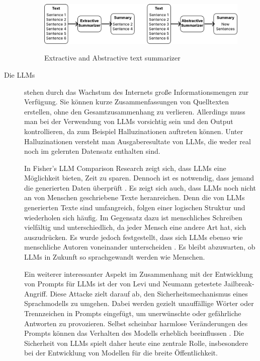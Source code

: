 \begin{description}
    \begin{figure}[H]
    \centering
    \includegraphics[width=0.8\linewidth]{Images/Extractive text summarizer and Abstractive text summarizer.pdf}\\
    \caption{Extractive and Abstractive text summarizer \cite[S.3]{yadav2022automatictextsummarizationmethods}}
    \label{fig:Extractive text summarizer and Abstractive text summarizer}
    \end{figure}

    
    \item[Die \ac{LLM}s] stehen durch das Wachstum des Internets große Informationsmengen zur Verfügung. Sie können kurze Zusammenfassungen von Quelltexten erstellen, ohne den Gesamtzusammenhang zu verlieren. Allerdings muss man bei der Verwendung von \ac{LLM}s vorsichtig sein und den Output kontrollieren, da zum Beispiel Halluzinationen auftreten können. Unter Halluzinationen versteht man Ausgaberesultate von \ac{LLM}s, die weder real noch im gelernten Datensatz enthalten sind. \cite[S.1]{banerjee2023benchmarkingllmpoweredchatbots}

    In Fisher's \ac{LLM} Comparison Research zeigt sich, dass \ac{LLM}s eine Möglichkeit bieten, Zeit zu sparen. Dennoch ist es notwendig, dass jemand die generierten Daten überprüft \cite{fisher2024large}. Es zeigt sich auch, dass \ac{LLM}s noch nicht an von Menschen geschriebene Texte heranreichen. Denn die von \ac{LLM}s generierten Texte sind umfangreich, folgen einer logischen Struktur und wiederholen sich häufig. Im Gegensatz dazu ist menschliches Schreiben vielfältig und unterschiedlich, da jeder Mensch eine andere Art hat, sich auszudrücken. Es wurde jedoch festgestellt, dass sich \ac{LLM}s ebenso wie menschliche Autoren voneinander unterscheiden \cite{rosenfeld2024whose}. Es bleibt abzuwarten, ob \ac{LLM}s in Zukunft so sprachgewandt werden wie Menschen.

     Ein weiterer interessanter Aspekt im Zusammenhang mit der Entwicklung von Prompts für \ac{LLM}s ist der von Levi und Neumann getestete Jailbreak-Angriff. Diese Attacke zielt darauf ab, den Sicherheitsmechanismus eines Sprachmodells zu umgehen. Dabei werden gezielt unauffällige Wörter oder Trennzeichen in Prompts eingefügt, um unerwünschte oder gefährliche Antworten zu provozieren. Selbst scheinbar harmlose Veränderungen des Prompts können das Verhalten des Modells erheblich beeinflussen \cite{levi2024vocabularyattackhijacklarge}. Die Sicherheit von \ac{LLM}s spielt daher heute eine zentrale Rolle, insbesondere bei der Entwicklung von Modellen für die breite Öffentlichkeit.
    

\end{description}
